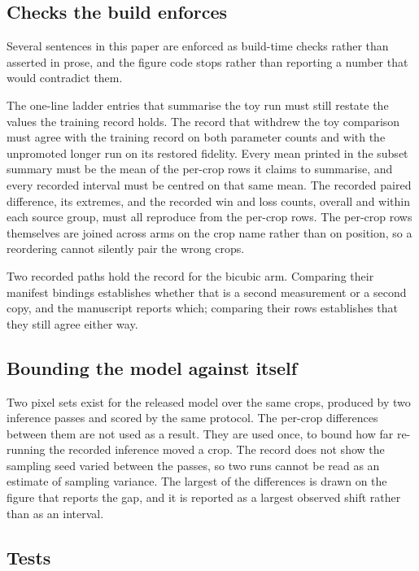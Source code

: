 \subsection{Checks the build enforces}

Several sentences in this paper are enforced as build-time checks rather than
asserted in prose, and the figure code stops rather than reporting a number that
would contradict them.

The one-line ladder entries that summarise the toy run must still restate the
values the training record holds. The record that withdrew the toy comparison
must agree with the training record on both parameter counts and with the
unpromoted longer run on its restored fidelity. Every mean printed in the subset
summary must be the mean of the per-crop rows it claims to summarise, and every
recorded interval must be centred on that same mean. The recorded paired
difference, its extremes, and the recorded win and loss counts, overall and
within each source group, must all reproduce from the per-crop rows. The per-crop
rows themselves are joined across arms on the crop name rather than on position,
so a reordering cannot silently pair the wrong crops.

Two recorded paths hold the record for the bicubic arm. Comparing their manifest bindings
establishes whether that is a second measurement or a second copy, and the
manuscript reports which; comparing their rows establishes that they still agree
either way.

\subsection{Bounding the model against itself}

Two pixel sets exist for the released model over the same \SubsetN{} crops,
produced by two inference passes and scored by the same protocol. The per-crop
differences between them are not used as a result. They are used once, to bound
how far re-running the recorded inference moved a crop. The record does not show
the sampling seed varied between the passes, so two runs cannot be read as an
estimate of sampling variance. The largest of the differences is drawn on the
figure that reports the gap, and it is reported as a largest observed shift
rather than as an interval.

\subsection{Tests}

